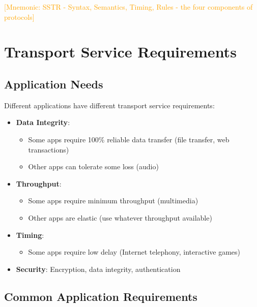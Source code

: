 \documentclass[12pt]{article}
\begin{document}
\textcolor{orange}{[Mnemonic: SSTR - Syntax, Semantics, Timing, Rules - the four components of protocols]}

\section{Transport Service Requirements}

\subsection{Application Needs}
Different applications have different transport service requirements:
\begin{itemize}
    \item \textbf{Data Integrity}:
          \begin{itemize}
              \item Some apps require 100\% reliable data transfer (file transfer, web transactions)
              \item Other apps can tolerate some loss (audio)
          \end{itemize}
    \item \textbf{Throughput}:
          \begin{itemize}
              \item Some apps require minimum throughput (multimedia)
              \item Other apps are elastic (use whatever throughput available)
          \end{itemize}
    \item \textbf{Timing}:
          \begin{itemize}
              \item Some apps require low delay (Internet telephony, interactive games)
          \end{itemize}
    \item \textbf{Security}: Encryption, data integrity, authentication
\end{itemize}

\subsection{Common Application Requirements}
\end{document}
